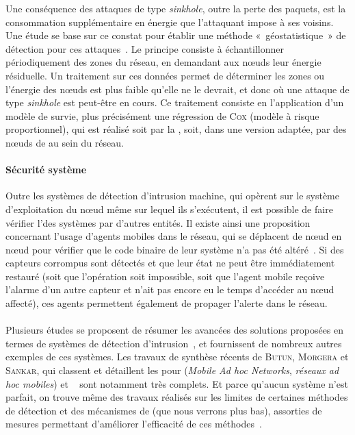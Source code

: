 Une conséquence des attaques de type \textit{sinkhole}, outre la perte des paquets, est la consommation supplémentaire en énergie que l'attaquant impose à ses voisins.
Une étude se base sur ce constat pour établir une méthode « géostatistique » de détection pour ces attaques~\cite{SKDM14}.
Le principe consiste à échantillonner périodiquement des zones du réseau, en demandant aux nœuds leur énergie résiduelle.
Un traitement sur ces données permet de déterminer les zones ou l'énergie des nœuds est plus faible qu'elle ne le devrait, et donc où une attaque de type \textit{sinkhole} est peut-être en cours.
Ce traitement consiste en l'application d'un modèle de survie, plus précisément une régression de \textsc{Cox} (modèle à risque proportionnel), qui est réalisé soit par la \sdb, soit, dans une version adaptée, par des nœuds de  au sein du réseau.

        \paragraph{Sécurité système}
Outre les systèmes de détection d'intrusion machine, qui opèrent sur le système d'exploitation du nœud même sur lequel ils s'exécutent, il est possible de faire vérifier l'\integrite des systèmes par d'autres entités.
Il existe ainsi une proposition concernant l'usage d'agents mobiles dans le réseau, qui se déplacent de nœud en nœud pour vérifier que le code binaire de leur système n'a pas été altéré~\cite{HR13}.
Si des capteurs corrompus sont détectés et que leur état ne peut être immédiatement restauré (soit que l'opération soit impossible, soit que l'agent mobile reçoive l'alarme d'un autre capteur et n'ait pas encore eu le temps d'accéder au nœud affecté), ces agents permettent également de propager l'alerte dans le réseau.

        \paragraph{}
Plusieurs études se proposent de résumer les avancées des solutions proposées en termes de systèmes de détection d'intrusion~\cite{ME13,MS14}, et fournissent de nombreux autres exemples de ces systèmes.
Les travaux de synthèse récents de \textsc{Butun, Morgera} et \textsc{Sankar}, qui classent et détaillent les \IDS pour \manet (\textit{Mobile Ad hoc Networks}, \textit{réseaux ad hoc mobiles}) et \rcsfs~\cite{BMS13} sont notamment très complets.
Et parce qu'aucun système \IDS n'est parfait, on trouve même des travaux réalisés sur les limites de certaines méthodes de détection et des mécanismes de  (que nous verrons plus bas), assorties de mesures permettant d'améliorer l'efficacité de ces méthodes~\cite{CQW12}.

